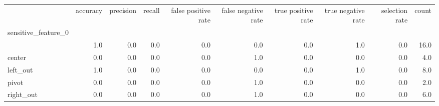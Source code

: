 \begin{tabular}{lrrrrrrrrr}
\toprule
{} &  accuracy &  precision &  recall &  false positive rate &  false negative rate &  true positive rate &  true negative rate &  selection rate &  count \\
sensitive\_feature\_0 &           &            &         &                      &                      &                     &                     &                 &        \\
\midrule
                    &       1.0 &        0.0 &     0.0 &                  0.0 &                  0.0 &                 0.0 &                 1.0 &             0.0 &   16.0 \\
center              &       0.0 &        0.0 &     0.0 &                  0.0 &                  1.0 &                 0.0 &                 0.0 &             0.0 &    4.0 \\
left\_out            &       1.0 &        0.0 &     0.0 &                  0.0 &                  0.0 &                 0.0 &                 1.0 &             0.0 &    8.0 \\
pivot               &       0.0 &        0.0 &     0.0 &                  0.0 &                  1.0 &                 0.0 &                 0.0 &             0.0 &    2.0 \\
right\_out           &       0.0 &        0.0 &     0.0 &                  0.0 &                  1.0 &                 0.0 &                 0.0 &             0.0 &    6.0 \\
\bottomrule
\end{tabular}
